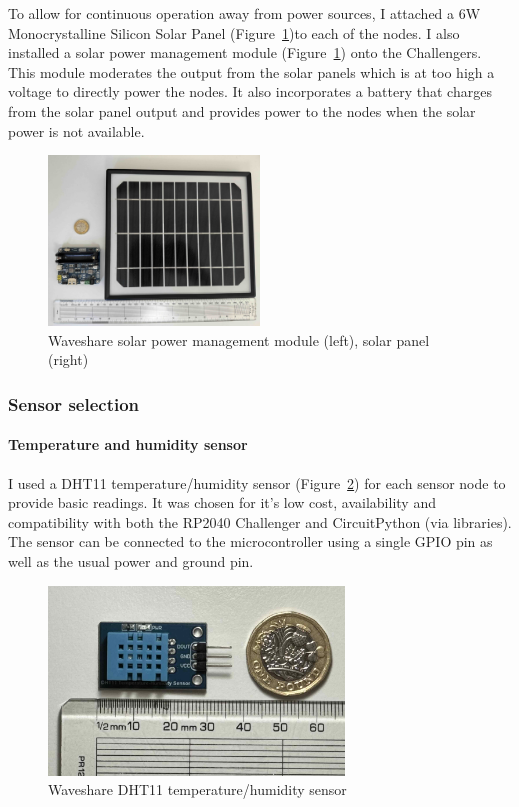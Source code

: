 To allow for continuous operation away from power sources, I attached a 6W
Monocrystalline Silicon Solar Panel (Figure~\ref{fig:solar-module})to each of
the nodes. I also installed a solar power management module
(Figure~\ref{fig:solar-module}) onto the Challengers. This module moderates the
output from the solar panels which is at too high a voltage to directly power
the nodes. It also incorporates a battery that charges from the solar panel
output and provides power to the nodes when the solar power is not available.

\begin{figure}[H]
    \centering
    \includegraphics[width=0.5\textwidth]{contents/part-2/fig2/solar-panel-manager.jpg}
    \caption{Waveshare solar power management module (left), solar panel (right)}
    \label{fig:solar-module}
\end{figure}

\subsubsection{Sensor selection} \label{sec:sensor-selection}

\paragraph{Temperature and humidity sensor}

I used a DHT11 temperature/humidity sensor (Figure~\ref{fig:dht11}) for each
sensor node to provide basic readings. It was chosen for it's low cost,
availability and compatibility with both the RP2040 Challenger and CircuitPython
(via libraries). The sensor can be connected to the microcontroller using a
single GPIO pin as well as the usual power and ground pin.

\begin{figure}[H]
    \centering
    \includegraphics[width=0.7\textwidth]{contents/part-2/fig2/dht11.jpg}
    \caption{Waveshare DHT11 temperature/humidity sensor}
    \label{fig:dht11}
\end{figure}

